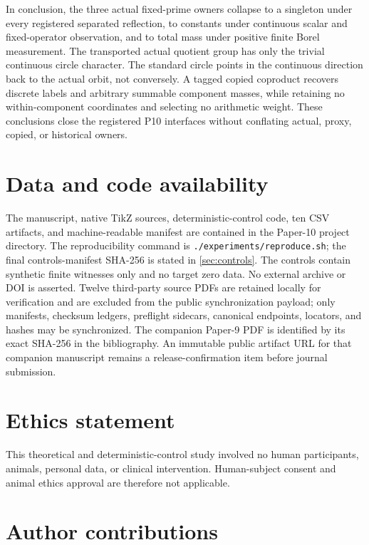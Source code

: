 \documentclass[11pt]{article}
\theoremstyle{definition}
\begin{document}
In conclusion, the three actual fixed-prime owners collapse to a singleton under every registered separated reflection, to constants under continuous scalar and fixed-operator observation, and to total mass under positive finite Borel measurement.  The transported actual quotient group has only the trivial continuous circle character.  The standard circle points in the continuous direction back to the actual orbit, not conversely.  A tagged copied coproduct recovers discrete labels and arbitrary summable component masses, while retaining no within-component coordinates and selecting no arithmetic weight.  These conclusions close the registered P10 interfaces without conflating actual, proxy, copied, or historical owners.

\section*{Data and code availability}

The manuscript, native TikZ sources, deterministic-control code, ten CSV artifacts, and machine-readable manifest are contained in the Paper-10 project directory.  The reproducibility command is \texttt{./experiments/reproduce.sh}; the final controls-manifest SHA-256 is stated in \cref{sec:controls}.  The controls contain synthetic finite witnesses only and no target zero data.  No external archive or DOI is asserted.  Twelve third-party source PDFs are retained locally for verification and are excluded from the public synchronization payload; only manifests, checksum ledgers, preflight sidecars, canonical endpoints, locators, and hashes may be synchronized.  The companion Paper-9 PDF is identified by its exact SHA-256 in the bibliography.  An immutable public artifact URL for that companion manuscript remains a release-confirmation item before journal submission.

\section*{Ethics statement}

This theoretical and deterministic-control study involved no human participants, animals, personal data, or clinical intervention.  Human-subject consent and animal ethics approval are therefore not applicable.

\section*{Author contributions}
\end{document}
